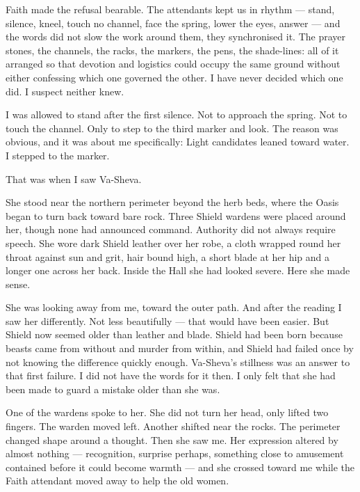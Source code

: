 Faith made the refusal bearable. The attendants kept us in rhythm --- stand, silence, kneel, touch no channel, face the spring, lower the eyes, answer --- and the words did not slow the work around them, they synchronised it. The prayer stones, the channels, the racks, the markers, the pens, the shade-lines: all of it arranged so that devotion and logistics could occupy the same ground without either confessing which one governed the other. I have never decided which one did. I suspect neither knew.\par

\ornament

\noindent I was allowed to stand after the first silence. Not to approach the spring. Not to touch the channel. Only to step to the third marker and look. The reason was obvious, and it was about me specifically: Light candidates leaned toward water. I stepped to the marker.\par

That was when I saw Va-Sheva.\par

She stood near the northern perimeter beyond the herb beds, where the Oasis began to turn back toward bare rock. Three Shield wardens were placed around her, though none had announced command. Authority did not always require speech. She wore dark Shield leather over her robe, a cloth wrapped round her throat against sun and grit, hair bound high, a short blade at her hip and a longer one across her back. Inside the Hall she had looked severe. Here she made sense.\par

She was looking away from me, toward the outer path. And after the reading I saw her differently. Not less beautifully --- that would have been easier. But Shield now seemed older than leather and blade. Shield had been born because beasts came from without and murder from within, and Shield had failed once by not knowing the difference quickly enough. Va-Sheva's stillness was an answer to that first failure. I did not have the words for it then. I only felt that she had been made to guard a mistake older than she was.\par

One of the wardens spoke to her. She did not turn her head, only lifted two fingers. The warden moved left. Another shifted near the rocks. The perimeter changed shape around a thought. Then she saw me. Her expression altered by almost nothing --- recognition, surprise perhaps, something close to amusement contained before it could become warmth --- and she crossed toward me while the Faith attendant moved away to help the old women.\par

